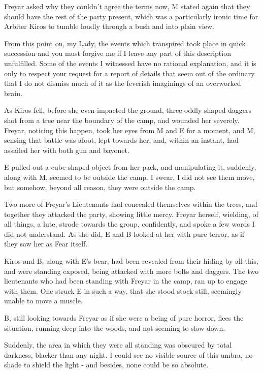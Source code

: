 Freyar asked why they couldn’t agree the terms now, M stated again that they should have the rest of the party present, which was a particularly ironic time for Arbiter Kiros to tumble loudly through a bush and into plain view.\medskip

From this point on, my Lady, the events which transpired took place in quick succession and you must forgive me if I leave any part of this description unfulfilled. Some of the events I witnessed have no rational explanation, and it is only to respect your request for a report of details that seem out of the ordinary that I do not dismiss much of it as the feverish imaginings of an overworked brain.\medskip

As Kiros fell, before she even impacted the ground, three oddly shaped daggers shot from a tree near the boundary of the camp, and wounded her severely. Freyar, noticing this happen, took her eyes from M and E for a moment, and M, sensing that battle was afoot, lept towards her, and, within an instant, had assailed her with both gun and bayonet.\medskip

E pulled out a cube-shaped object from her pack, and manipulating it, suddenly, along with M, seemed to be outside the camp. I swear, I did not see them move, but somehow, beyond all reason, they were outside the camp.\medskip

Two more of Freyar’s Lieutenants had concealed themselves within the trees, and together they attacked the party, showing little mercy. Freyar herself, wielding, of all things, a lute, strode towards the group, confidently, and spoke a few words I did not understand. As she did, E and B looked at her with pure terror, as if they saw her as Fear itself.\medskip

Kiros and B, along with E’s bear, had been revealed from their hiding by all this, and were standing exposed, being attacked with more bolts and daggers. The two lieutenants who had been standing with Freyar in the camp, ran up to engage with them. One struck E in such a way, that she stood stock still, seemingly unable to move a muscle.\medskip

B, still looking towards Freyar as if she were a being of pure horror, flees the situation, running deep into the woods, and not seeming to slow down.\medskip

Suddenly, the area in which they were all standing was obscured by total darkness, blacker than any night. I could see no visible source of this umbra, no shade to shield the light - and besides, none could be so absolute.\medskip


